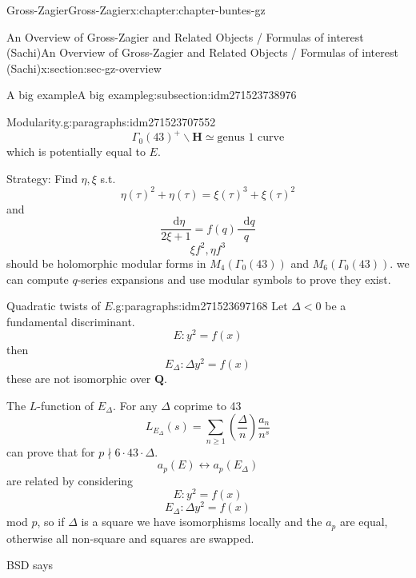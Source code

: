 \documentclass[oneside,10pt,]{book}
\numberwithin{equation}{section}
\newcommand{\diff}{\mathop{}\!\mathrm{d}}
\newcommand{\legendre}[2]{\left(\frac{#1}{#2}\right)}
\newcommand{\QQ}{\mathbf{Q}}
\newcommand{\HH}{\mathbf{H}}
\newcommand{\lt}{<}
\begin{document}
\begin{chapterptx}{Gross-Zagier}{}{Gross-Zagier}{}{}{x:chapter:chapter-buntes-gz}
\begin{sectionptx}{An Overview of Gross-Zagier and Related Objects \slash{} Formulas of interest (Sachi)}{}{An Overview of Gross-Zagier and Related Objects \slash{} Formulas of interest (Sachi)}{}{}{x:section:sec-gz-overview}
\begin{subsectionptx}{A big example}{}{A big example}{}{}{g:subsection:idm271523738976}
\begin{paragraphs}{Modularity.}{g:paragraphs:idm271523707552}
\begin{equation*}
\end{equation*}
%
\begin{equation*}
\Gamma _0(43)^+ \backslash \HH \simeq \text{genus 1 curve}
\end{equation*}
which is potentially equal to \(E\).%
\par
Strategy: Find \(\eta ,\xi \) s.t.%
\begin{equation*}
\eta(\tau )^2 + \eta(\tau ) = \xi (\tau )^3 + \xi (\tau )^2
\end{equation*}
and%
\begin{equation*}
\frac{\diff \eta}{2\xi  + 1} = f(q) \frac{\diff q}{q}
\end{equation*}
%
\begin{equation*}
\xi f^2, \eta f^3
\end{equation*}
should be holomorphic modular forms in \(M_4(\Gamma _0(43))\) and \(M_6(\Gamma _0(43))\). we can compute \(q\)-series expansions and use modular symbols to prove they exist.%
\end{paragraphs}%
\begin{paragraphs}{Quadratic twists of \(E\).}{g:paragraphs:idm271523697168}%
Let \(\Delta \lt  0\) be a fundamental discriminant.%
\begin{equation*}
E\colon y^2 = f(x)
\end{equation*}
then%
\begin{equation*}
E_{\Delta }\colon \Delta y^2 = f(x)
\end{equation*}
these are not isomorphic over \(\QQ\).%
\par
The \(L\)-function of \(E_\Delta \). For any \(\Delta \) coprime to 43%
\begin{equation*}
L_{E_\Delta } (s) = \sum_{n\ge 1} \legendre \Delta  n \frac{a_n}{n^s}
\end{equation*}
can prove that for \(p\nmid 6\cdot 43 \cdot \Delta \).%
\begin{equation*}
a_p(E) \leftrightarrow a_p(E_\Delta )
\end{equation*}
are related by considering%
\begin{equation*}
E\colon  y^2 = f(x)
\end{equation*}
%
\begin{equation*}
E_\Delta \colon  \Delta y^2= f(x)
\end{equation*}
mod \(p\), so if \(\Delta \) is a square we have isomorphisms locally and the \(a_p\) are equal, otherwise all non-square and squares are swapped.%
\par
BSD says%
\begin{equation*}

\end{equation*}
\end{paragraphs}
\end{subsectionptx}
\end{sectionptx}
\end{chapterptx}
\end{document}
